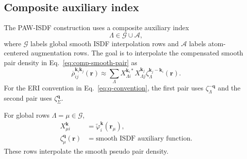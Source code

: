 \documentclass[aps,prb,reprint,superscriptaddress,longbibliography,nofootinbib]{revtex4-2}
\newcommand{\br}{\mathbf r}
\newcommand{\bk}{\mathbf k}
\newcommand{\bq}{\mathbf q}
\begin{document}
\subsection{Composite auxiliary index}

The PAW-ISDF construction uses a composite auxiliary index
\begin{equation}
\Lambda\in \mathcal G\cup\mathcal A,
\label{eq:lambda-composite}
\end{equation}
where \(\mathcal G\) labels global smooth ISDF interpolation rows and \(\mathcal A\) labels atom-centered augmentation rows.  The goal is to interpolate the compensated smooth pair density in Eq.~\eqref{eq:comp-smooth-pair} as
\begin{equation}
\overline\rho_{ij}^{\bk_i\bk_j}(\br)
\approx
\sum_{\Lambda}
X_{\Lambda i}^{\bk_i *}X_{\Lambda j}^{\bk_j}
\zeta_\Lambda^{\bk_j-\bk_i}(\br).
\label{eq:paw-isdf-density}
\end{equation}
For the ERI convention in Eq.~\eqref{eq:q-convention}, the first pair uses \(\zeta_\Lambda^{-\bq}\) and the second pair uses \(\zeta_\Sigma^{\bq}\).

For global rows \(\Lambda=\mu\in\mathcal G\),
\begin{equation}
\begin{aligned}
X_{\mu i}^{\bk}&=\widetilde\varphi_i^{\bk}(\br_\mu),\\
\zeta_\mu^{\bq}(\br)&=\text{smooth ISDF auxiliary function}.
\end{aligned}
\label{eq:global-x}
\end{equation}
These rows interpolate the smooth pseudo pair density.
\end{document}
